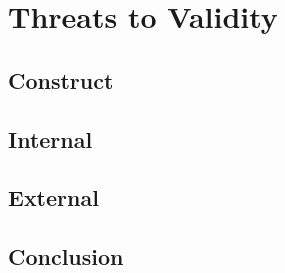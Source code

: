 \chapter{Threats to Validity}
\section{Construct}
\section{Internal}
\section{External}
\section{Conclusion}
